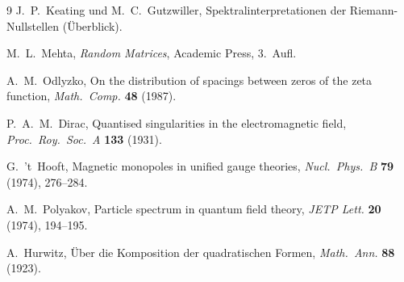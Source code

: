 \documentclass[11pt,a4paper]{article}
\begin{document}
\begin{thebibliography}{9}
J.~P.~Keating und M.~C.~Gutzwiller,
Spektralinterpretationen der Riemann-Nullstellen (Überblick).

M.~L.~Mehta,
\emph{Random Matrices},
Academic Press, 3.\ Aufl.

A.~M.~Odlyzko,
On the distribution of spacings between zeros of the zeta function,
\emph{Math.\ Comp.} \textbf{48} (1987).

P.~A.~M.~Dirac,
Quantised singularities in the electromagnetic field,
\emph{Proc.\ Roy.\ Soc.\ A} \textbf{133} (1931).

G.~'t~Hooft,
Magnetic monopoles in unified gauge theories,
\emph{Nucl.\ Phys.\ B} \textbf{79} (1974), 276--284.

A.~M.~Polyakov,
Particle spectrum in quantum field theory,
\emph{JETP Lett.} \textbf{20} (1974), 194--195.

A.~Hurwitz,
Über die Komposition der quadratischen Formen,
\emph{Math.\ Ann.} \textbf{88} (1923).
\end{thebibliography}
\end{document}
